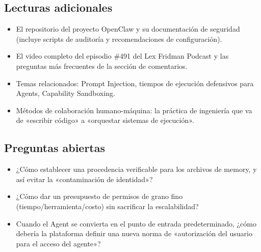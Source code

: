 \documentclass[a4paper]{article}
\begin{document}
\subsection{Lecturas adicionales}
\begin{itemize}
    \item El repositorio del proyecto OpenClaw y su documentación de seguridad (incluye scripts de auditoría y recomendaciones de configuración).
    \item El video completo del episodio \#491 del Lex Fridman Podcast y las preguntas más frecuentes de la sección de comentarios.
    \item Temas relacionados: Prompt Injection, tiempos de ejecución defensivos para Agents, Capability Sandboxing.
    \item Métodos de colaboración humano-máquina: la práctica de ingeniería que va de «escribir código» a «orquestar sistemas de ejecución».
\end{itemize}

\subsection{Preguntas abiertas}
\begin{itemize}
    \item ¿Cómo establecer una procedencia verificable para los archivos de memory, y así evitar la «contaminación de identidad»?
    \item ¿Cómo dar un presupuesto de permisos de grano fino (tiempo/herramienta/costo) sin sacrificar la escalabilidad?
    \item Cuando el Agent se convierta en el punto de entrada predeterminado, ¿cómo debería la plataforma definir una nueva norma de «autorización del usuario para el acceso del agente»?
\end{itemize}
\end{document}
